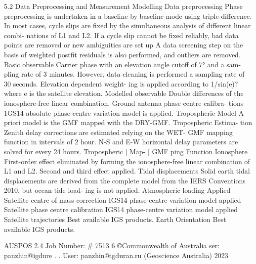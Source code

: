 \documentclass[a4paper,12pt]{article}
\begin{document}
    5.2 Data Preprocessing and Measurement Modelling         Data preprocessing    Phase preprocessing is undertaken in a baseline by baseline  mode using triple-difference. In most cases, cycle slips are  fixed by the simultaneous analysis of different linear combi-  nations of L1 and L2. If a cycle slip cannot be fixed reliably,  bad data points are removed or new ambiguities are set up A  data screening step on the basis of weighted postfit residuals  is also performed, and outliers are removed.         Basic observable    Carrier phase with an elevation angle cutoff of 7° and a sam-  pling rate of 3 minutes. However, data cleaning is performed  a sampling rate of 30 seconds. Elevation dependent weight-  ing is applied according to 1/sin(e)? where e is the satellite  elevation.         Modelled observable    Double differences of the ionosphere-free linear combination.         Ground antenna  phase centre calibra-  tions    1GS14 absolute phase-centre variation model is applied.         Tropospheric Model    A priori model is the GMF mapped with the DRY-GMF.         Tropospheric Estima-  tion    Zenith delay corrections are estimated relying on the WET-  GMF mapping function in intervals of 2 hour. N-S and E-W  horizontal delay parameters are solved for every 24 hours.              Tropospheric | Map- | GMF  ping Function  Ionosphere First-order effect eliminated by forming the ionosphere-free    linear combination of L1 and L2. Second and third effect  applied.         Tidal displacements    Solid earth tidal displacements are derived from the complete  model from the IERS Conventions 2010, but ocean tide load-  ing is not applied.         Atmospheric loading    Applied         Satellite centre of  mass correction    IGS14 phase-centre variation model applied         Satellite phase centre  calibration    IGS14 phase-centre variation model applied         Satellite trajectories    Best available IGS products.         Earth Orientation              Best available IGS products.          

\vspace{10pt}

         AUSPOS 2.4 Job Number: \# 7513 6 ©Commonwealth of Australia    ser: panzhin@igdure . .  User: panzhin@igduran.ru (Geoscience Australia) 2023 

\vspace{10pt}

\par

\vspace{10pt}
\end{document}
